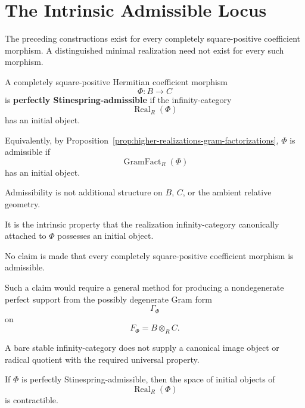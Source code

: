 \section{The Intrinsic Admissible Locus}
\label{sec:higher-stinespring-admissible-locus}

The preceding constructions exist for every completely square-positive
coefficient morphism. A distinguished minimal realization need not exist for
every such morphism.

\begin{definition}
\label{def:higher-stinespring-admissible}
A completely square-positive Hermitian coefficient morphism
\[
  \Phi:B\to C
\]
is \textbf{perfectly Stinespring-admissible} if the infinity-category
\[
  \operatorname{Real}_R(\Phi)
\]
has an initial object.

Equivalently, by
Proposition~\ref{prop:higher-realizations-gram-factorizations},
\(\Phi\) is admissible if
\[
  \operatorname{GramFact}_R(\Phi)
\]
has an initial object.
\end{definition}

\begin{remark}
\label{rem:higher-admissibility-property}
Admissibility is not additional structure on \(B\), \(C\), or the ambient
relative geometry.

It is the intrinsic property that the realization infinity-category
canonically attached to \(\Phi\) possesses an initial object.
\end{remark}

\begin{remark}
\label{rem:higher-no-unrestricted-stinespring}
No claim is made that every completely square-positive coefficient morphism
is admissible.

Such a claim would require a general method for producing a nondegenerate
perfect support from the possibly degenerate Gram form
\[
  \Gamma_\Phi
\]
on
\[
  F_\Phi=B\otimes_RC.
\]

A bare stable infinity-category does not supply a canonical image object or
radical quotient with the required universal property.
\end{remark}

\begin{proposition}
\label{prop:higher-contractibility-minimal-choices}
If \(\Phi\) is perfectly Stinespring-admissible, then the space of initial
objects of
\[
  \operatorname{Real}_R(\Phi)
\]
is contractible.
\end{proposition}

